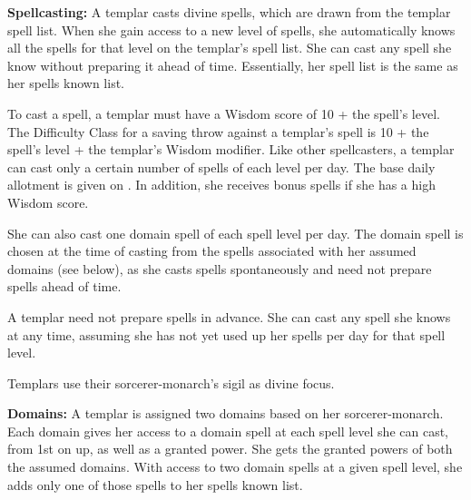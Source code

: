\textbf{Spellcasting:} A templar casts divine spells, which are drawn from the templar spell list. When she gain access to a new level of spells, she automatically knows all the spells for that level on the templar's spell list. She can cast any spell she know without preparing it ahead of time. Essentially, her spell list is the same as her spells known list.

To cast a spell, a templar must have a Wisdom score of 10 + the spell's level. The Difficulty Class for a saving throw against a templar's spell is 10 + the spell's level + the templar's Wisdom modifier. Like other spellcasters, a templar can cast only a certain number of spells of each level per day. The base daily allotment is given on . In addition, she receives bonus spells if she has a high Wisdom score.

She can also cast one domain spell of each spell level per day. The domain spell is chosen at the time of casting from the spells associated with her assumed domains (see below), as she casts spells spontaneously and need not prepare spells ahead of time.

A templar need not prepare spells in advance. She can cast any spell she knows at any time, assuming she has not yet used up her spells per day for that spell level.

Templars use their sorcerer-monarch's sigil as divine focus.


\textbf{Domains:} A templar is assigned two domains based on her sorcerer-monarch. Each domain gives her access to a domain spell at each spell level she can cast, from 1st on up, as well as a granted power. She gets the granted powers of both the assumed domains. With access to two domain spells at a given spell level, she adds only one of those spells to her spells known list.




